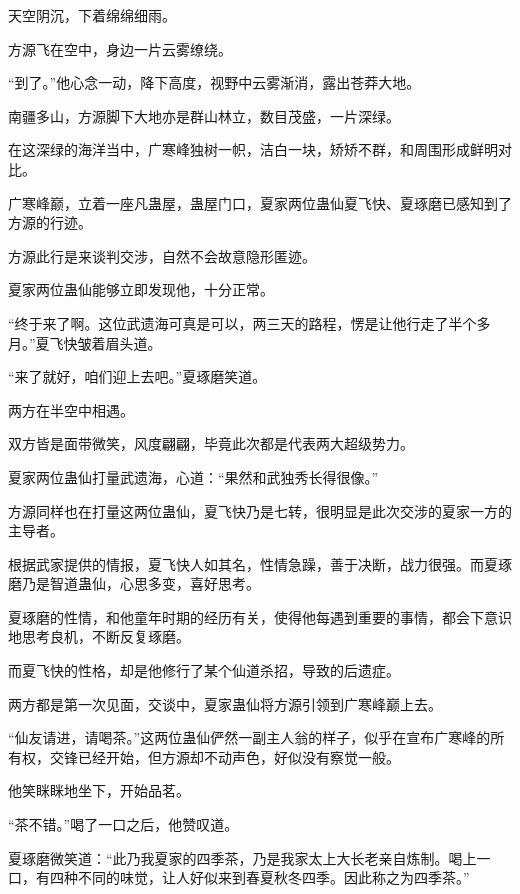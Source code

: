 
\begin{this_body}



天空阴沉，下着绵绵细雨。

方源飞在空中，身边一片云雾缭绕。

“到了。”他心念一动，降下高度，视野中云雾渐消，露出苍莽大地。

南疆多山，方源脚下大地亦是群山林立，数目茂盛，一片深绿。

在这深绿的海洋当中，广寒峰独树一帜，洁白一块，矫矫不群，和周围形成鲜明对比。

广寒峰巅，立着一座凡蛊屋，蛊屋门口，夏家两位蛊仙夏飞快、夏琢磨已感知到了方源的行迹。

方源此行是来谈判交涉，自然不会故意隐形匿迹。

夏家两位蛊仙能够立即发现他，十分正常。

“终于来了啊。这位武遗海可真是可以，两三天的路程，愣是让他行走了半个多月。”夏飞快皱着眉头道。

“来了就好，咱们迎上去吧。”夏琢磨笑道。

两方在半空中相遇。

双方皆是面带微笑，风度翩翩，毕竟此次都是代表两大超级势力。

夏家两位蛊仙打量武遗海，心道：“果然和武独秀长得很像。”

方源同样也在打量这两位蛊仙，夏飞快乃是七转，很明显是此次交涉的夏家一方的主导者。

根据武家提供的情报，夏飞快人如其名，性情急躁，善于决断，战力很强。而夏琢磨乃是智道蛊仙，心思多变，喜好思考。

夏琢磨的性情，和他童年时期的经历有关，使得他每遇到重要的事情，都会下意识地思考良机，不断反复琢磨。

而夏飞快的性格，却是他修行了某个仙道杀招，导致的后遗症。

两方都是第一次见面，交谈中，夏家蛊仙将方源引领到广寒峰巅上去。

“仙友请进，请喝茶。”这两位蛊仙俨然一副主人翁的样子，似乎在宣布广寒峰的所有权，交锋已经开始，但方源却不动声色，好似没有察觉一般。

他笑眯眯地坐下，开始品茗。

“茶不错。”喝了一口之后，他赞叹道。

夏琢磨微笑道：“此乃我夏家的四季茶，乃是我家太上大长老亲自炼制。喝上一口，有四种不同的味觉，让人好似来到春夏秋冬四季。因此称之为四季茶。”


\end{this_body}

